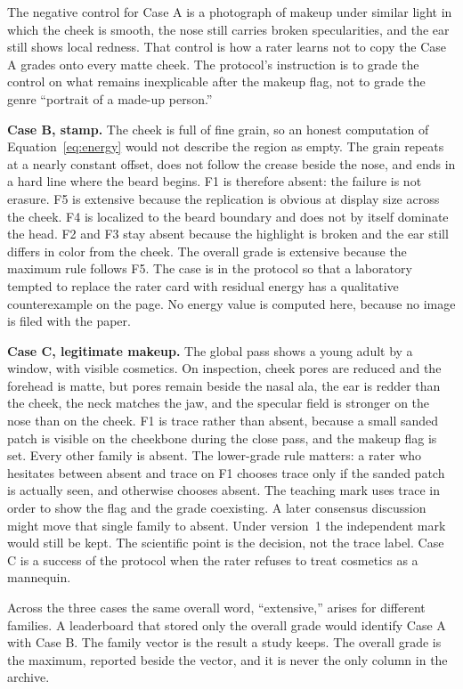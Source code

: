 \documentclass[10pt,twocolumn]{article}
\begin{document}
The negative control for Case A is a photograph of makeup under similar light in which the cheek is smooth, the nose still carries broken specularities, and the ear still shows local redness. That control is how a rater learns not to copy the Case A grades onto every matte cheek. The protocol's instruction is to grade the control on what remains inexplicable after the makeup flag, not to grade the genre ``portrait of a made-up person.''

\textbf{Case B, stamp.}
The cheek is full of fine grain, so an honest computation of Equation~\eqref{eq:energy} would not describe the region as empty. The grain repeats at a nearly constant offset, does not follow the crease beside the nose, and ends in a hard line where the beard begins. F1 is therefore absent: the failure is not erasure. F5 is extensive because the replication is obvious at display size across the cheek. F4 is localized to the beard boundary and does not by itself dominate the head. F2 and F3 stay absent because the highlight is broken and the ear still differs in color from the cheek. The overall grade is extensive because the maximum rule follows F5. The case is in the protocol so that a laboratory tempted to replace the rater card with residual energy has a qualitative counterexample on the page. No energy value is computed here, because no image is filed with the paper.

\textbf{Case C, legitimate makeup.}
The global pass shows a young adult by a window, with visible cosmetics. On inspection, cheek pores are reduced and the forehead is matte, but pores remain beside the nasal ala, the ear is redder than the cheek, the neck matches the jaw, and the specular field is stronger on the nose than on the cheek. F1 is trace rather than absent, because a small sanded patch is visible on the cheekbone during the close pass, and the makeup flag is set. Every other family is absent. The lower-grade rule matters: a rater who hesitates between absent and trace on F1 chooses trace only if the sanded patch is actually seen, and otherwise chooses absent. The teaching mark uses trace in order to show the flag and the grade coexisting. A later consensus discussion might move that single family to absent. Under version~1 the independent mark would still be kept. The scientific point is the decision, not the trace label. Case C is a success of the protocol when the rater refuses to treat cosmetics as a mannequin.

Across the three cases the same overall word, ``extensive,'' arises for different families. A leaderboard that stored only the overall grade would identify Case A with Case B. The family vector is the result a study keeps. The overall grade is the maximum, reported beside the vector, and it is never the only column in the archive.
\end{document}

